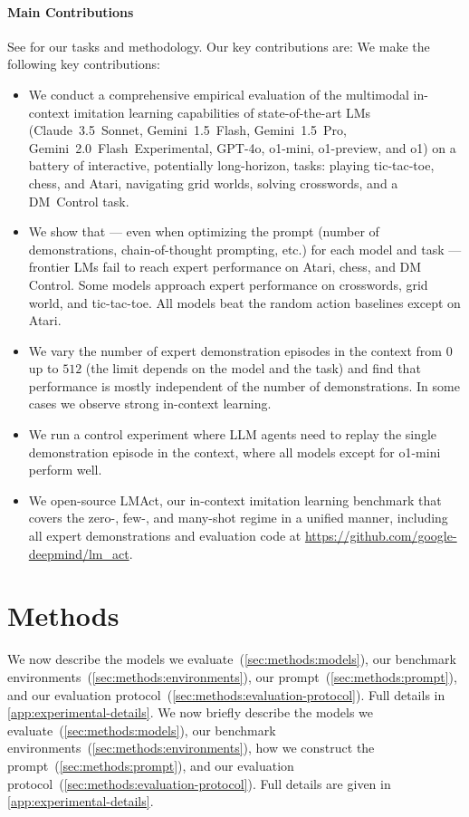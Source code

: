 \documentclass{article}
\newcommand{\etc}{etc.}
\newcommand{\claude}{Claude~3.5~Sonnet}
\newcommand{\expflash}{Gemini~2.0~Flash~Experimental}
\newcommand{\flash}{Gemini~1.5~Flash}
\newcommand{\pro}{Gemini~1.5~Pro}
\newcommand{\gpt}{GPT-4o}
\newcommand{\mini}{o1-mini}
\newcommand{\preview}{o1-preview}
\newcommand{\oone}{o1}
\begin{document}
\paragraph{Main Contributions}
See  for our tasks and methodology.
\ificlr
Our key contributions are:
\else
We make the following key contributions:
\fi
\begin{itemize}
    \item We conduct a comprehensive empirical evaluation of the multimodal in-context imitation learning capabilities of state-of-the-art LMs (\claude, \flash, \pro, \expflash, \gpt, \mini, \preview, and \oone) on a battery of interactive, potentially long-horizon, tasks: playing tic-tac-toe, chess, and Atari, navigating grid worlds, solving crosswords, and a DM~Control task.
    \item We show that --- even when optimizing the prompt (number of demonstrations, chain-of-thought prompting, \etc) for each model and task --- frontier LMs fail to reach expert performance on Atari, chess, and DM Control.
    Some models approach expert performance on crosswords, grid world, and tic-tac-toe.
    All models beat the random action baselines except on Atari.
    \item We vary the number of expert demonstration episodes in the context from $0$ up to $512$ (the limit depends on the model and the task) and find that performance is mostly independent of the number of demonstrations. In some cases we observe strong in-context learning.
    \item We run a control experiment where LLM agents need to replay the single demonstration episode in the context, where all models except for \mini{} perform well.
    \item We open-source \ificlr
    LMAct,
    \else\fi our in-context imitation learning benchmark that covers the zero-, few-, and many-shot regime in a unified manner, including all expert demonstrations and evaluation code at
    \url{https://github.com/google-deepmind/lm_act}.
\end{itemize}
    \section{Methods}
\label{sec:methods}
\ificlr
We now describe the models we evaluate~(\cref{sec:methods:models}), our benchmark environments~(\cref{sec:methods:environments}), our prompt~(\cref{sec:methods:prompt}), and our evaluation protocol~(\cref{sec:methods:evaluation-protocol}).
Full details in \cref{app:experimental-details}.
\else
We now briefly describe the models we evaluate~(\cref{sec:methods:models}), our benchmark environments~(\cref{sec:methods:environments}), how we construct the prompt~(\cref{sec:methods:prompt}), and our evaluation protocol~(\cref{sec:methods:evaluation-protocol}).
Full details are given in \cref{app:experimental-details}.
\fi
\end{document}
